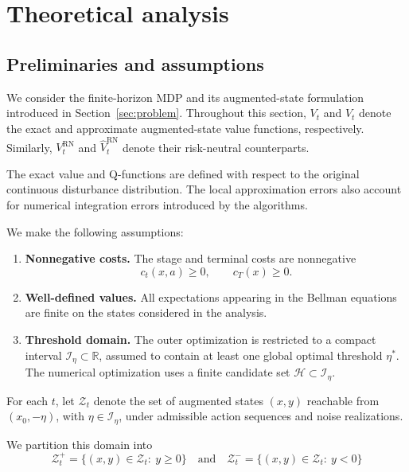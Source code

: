 \section{Theoretical analysis}
\label{sec:theory}
 
\subsection{Preliminaries and assumptions}
\label{theory:preliminaries}

We consider the finite-horizon MDP and its augmented-state
formulation introduced in Section~\ref{sec:problem}.
Throughout this section, $V_t$ and $\hat{V}_t$ denote the
exact and approximate augmented-state value functions,
respectively. Similarly, $V_t^{\text{RN}}$ and
$\hat{V}_t^{\text{RN}}$ denote their risk-neutral counterparts.

The exact value and Q-functions are defined with respect
to the original continuous disturbance distribution.
The local approximation errors also account for numerical
integration errors introduced by the algorithms.

We make the following assumptions:
\begin{enumerate}
	\item \textbf{Nonnegative costs.}
	The stage and terminal costs are nonnegative
	\begin{equation*}
		c_t(x,a) \geq 0, \qquad c_T(x) \geq 0.
	\end{equation*}
	
	\item \textbf{Well-defined values.}
	All expectations appearing in the Bellman equations
	are finite on the states considered in the analysis.
	
	\item \textbf{Threshold domain.}
	The outer optimization is restricted to a compact
	interval $\mathcal{I}_\eta \subset \mathbb R$,
	assumed to contain at least one global optimal threshold
	$\eta^*$. The numerical optimization uses a
	finite candidate set $\mathcal{H} \subset \mathcal{I}_\eta$.
\end{enumerate}

For each $t$, let $\mathcal{Z}_t$ denote the set of augmented states $(x,y)$ reachable from $(x_0,-\eta)$, with $\eta\in\mathcal{I}_{\eta}$, under admissible action sequences and noise realizations.

We partition this domain into
\begin{equation}
	\mathcal{Z}_t^+ = \{ (x, y) \in \mathcal{Z}_t:\ y \geq 0 \} \quad \text{and} \quad \mathcal{Z}_t^- = \{ (x, y) \in \mathcal{Z}_t:\ y < 0 \}
	\label{possible-state-decomposition}
\end{equation}

